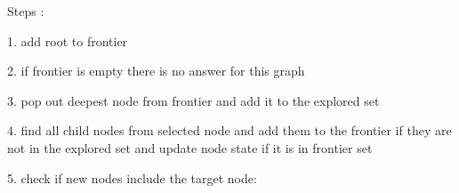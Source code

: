 \documentclass[preview]{standalone}
\begin{document}
\begin{center}
\begin{flushleft}Steps : \end{flushleft}\begin{flushleft} 1. add root to frontier\end{flushleft} \begin{flushleft} 2. if frontier is empty there is no answer for this graph\end{flushleft} \begin{flushleft} 3. pop out deepest node from frontier and add it to the explored set  \end{flushleft}\begin{flushleft} 4. find all child nodes from selected node and add them to the frontier \newline if they are not in the explored set and update node state if it is in frontier set \newline \end{flushleft}\begin{flushleft} 5. check if new nodes include the target node:  \end{flushleft}
\end{center}
\end{document}
